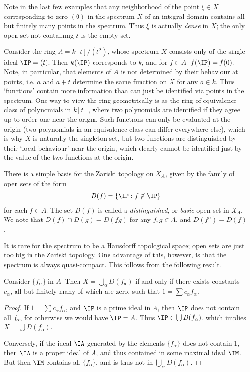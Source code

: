 Note in the last few examples that any neighborhood of the point $\xi \in X$ corresponding to zero $(0)$ in the spectrum $X$ of an integral domain contains all but finitely many points in the spectrum. Thus $\xi$ is actually \emph{dense} in $X$; the only open set not containing $\xi$ is the empty set.

\begin{example}
    Consider the ring $A = k[t]/(t^2)$, whose spectrum $X$ consists only of the single ideal $\IP = (t)$. Then $k(\IP)$ corresponds to $k$, and for $f \in A$, $f(\IP) = f(0)$. Note, in particular, that elements of $A$ is not determined by their behaviour at points, i.e. $a$ and $a + t$ determine the same function on $X$ for any $a \in k$. Thus `functions' contain more information than can just be identified via points in the spectrum. One way to view the ring geometrically is as the ring of equivalence class of polynomials in $k[t]$, where two polynomials are identified if they agree up to order one near the origin. Such functions can only be evaluated at the origin (two polynomials in an equivalence class can differ everywhere else), which is why $X$ is naturally the singleton set, but two functions are distinguished by their `local behaviour' near the origin, which clearly cannot be identified just by the value of the two functions at the origin.
\end{example}

There is a simple basis for the Zariski topology on $X_A$, given by the family of open sets of the form
%
\[ D(f) = \{ \IP : f \not \in \IP \} \]
%
for each $f \in A$. The set $D(f)$ is called a \emph{distinguished}, or \emph{basic} open set in $X_A$. We note that $D(f) \cap D(g) = D(fg)$ for any $f,g \in A$, and $D(f^n) = D(f)$.

It is rare for the spectrum to be a Hausdorff topological space; open sets are just too big in the Zariski topology. One advantage of this, however, is that the spectrum is always quasi-compact. This follows from the following result.

\begin{lemma}
    Consider $\{ f_\alpha \}$ in $A$. Then $X = \bigcup_\alpha D(f_\alpha)$ if and only if there exists constants $c_\alpha$, all but finitely many of which are zero, such that $1 = \sum c_\alpha f_\alpha$.
\end{lemma}
\begin{proof}
    If $1 = \sum c_\alpha f_\alpha$, and $\IP$ is a prime ideal in $A$, then $\IP$ does not contain all $f_\alpha$, for otherwise we would have $\IP = A$. Thus $\IP \in \bigcup D(f_\alpha)$, which implies $X = \bigcup D(f_\alpha)$.

    Conversely, if the ideal $\IA$ generated by the elements $\{ f_\alpha \}$ does not contain 1, then $\IA$ is a proper ideal of $A$, and thus contained in some maximal ideal $\IM$. But then $\IM$ contains all $\{ f_\alpha \}$, and is thus not in $\bigcup_\alpha D(f_\alpha)$.
\end{proof}


